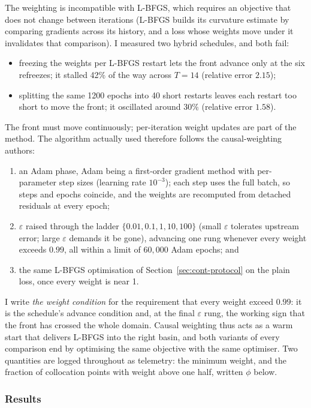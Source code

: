 \documentclass[11pt,a4paper]{article}
\begin{document}
The weighting is incompatible with L-BFGS, which requires an objective
that does not change between iterations (L-BFGS builds its curvature
estimate by comparing gradients across its history, and a loss whose
weights move under it invalidates that comparison). I measured two hybrid
schedules, and both fail:
\begin{itemize}
  \item freezing the weights per L-BFGS restart lets the front advance
  only at the six refreezes; it stalled 42\% of the way across $T = 14$
  (relative error $2.15$);
  \item splitting the same 1200 epochs into 40 short restarts leaves each
  restart too short to move the front; it oscillated around 30\%
  (relative error $1.58$).
\end{itemize}
The front must move continuously; per-iteration weight updates are part of
the method. The algorithm actually used therefore follows the
causal-weighting authors:
\begin{enumerate}
  \item an Adam phase, Adam being a first-order gradient method with
  per-parameter step sizes (learning rate $10^{-3}$); each step uses the
  full batch, so steps and epochs coincide, and the weights are
  recomputed from detached residuals at every epoch;
  \item $\varepsilon$ raised through the ladder
  $\{0.01, 0.1, 1, 10, 100\}$ (small $\varepsilon$ tolerates upstream
  error; large $\varepsilon$ demands it be gone), advancing one rung
  whenever every weight exceeds $0.99$, all within a limit of
  $60{,}000$ Adam epochs; and
  \item the same L-BFGS optimisation of Section~\ref{sec:cont-protocol}
  on the plain loss, once every weight is near 1.
\end{enumerate}
I write \emph{the weight condition} for the requirement that every
weight exceed $0.99$: it is the schedule's advance condition and, at the
final $\varepsilon$ rung, the working sign that the front has crossed the
whole domain. Causal weighting thus acts as a warm start that delivers
L-BFGS into the right basin, and both variants of every comparison end by
optimising the same objective with the same optimiser. Two quantities are
logged throughout as telemetry: the minimum weight, and the fraction of
collocation points with weight above one half, written $\phi$ below.

\subsubsection{Results}
\end{document}
